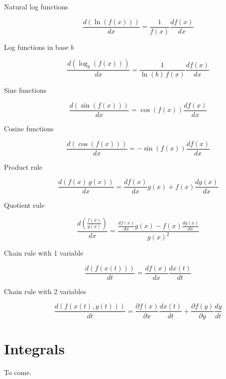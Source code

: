 \begin{description}
	\item[Natural log functions]
		\begin{equation}
			\frac{d\left( \ln\left( f(x) \right) \right)}{dx} = \frac{1}{f(x)} \frac{df(x)}{dx}
		\end{equation}
	
	\item[Log functions in base $b$]
		\begin{equation}
			\frac{d\left( \log_{b}\left( f(x) \right) \right)}{dx} = \frac{1}{\ln(b)\, f(x)} \frac{df(x)}{dx}
		\end{equation}
	
	\item[Sine functions]
		\begin{equation}
			\frac{d \left( \sin \left( f(x) \right) \right)}{dx} = \cos \left( f(x) \right) \frac{d f(x)}{dx}
		\end{equation}
		
	\item[Cosine functions]
		\begin{equation}
			\frac{d \left( \cos \left( f(x) \right) \right)}{dx} = -\sin \left( f(x) \right) \frac{d f(x)}{dx}
		\end{equation}
		
	\item[Product rule]
		\begin{equation}
			\frac{d\left( f(x)\, g(x) \right)}{dx} = \frac{df(x)}{dx} g(x) + f(x) \frac{dg(x)}{dx}
		\end{equation}
		
	\item[Quotient rule]
		\begin{equation}
			\frac{d \left( \frac{f(x)}{g(x)} \right)}{dx} = \frac{\frac{df(x)}{dx} g(x) - f(x) \frac{dg(x)}{dx}}{g(x)^2}
		\end{equation}
		
	\item[Chain rule with 1 variable]
		\begin{equation}
			\frac{d \left( f\left( x(t) \right) \right)}{dt} = \frac{df(x)}{dx} \frac{dx(t)}{dt}
		\end{equation}
		
	\item[Chain rule with 2 variables]
		\begin{equation}
			\frac{d \left( f\left( x(t), y(t) \right) \right)}{dt} = \frac{\partial f(x)}{\partial x} \frac{dx(t)}{dt} + \frac{\partial f(y)}{\partial y} \frac{dy}{dt}
		\end{equation}
		
\end{description}

\section{Integrals}

To come.